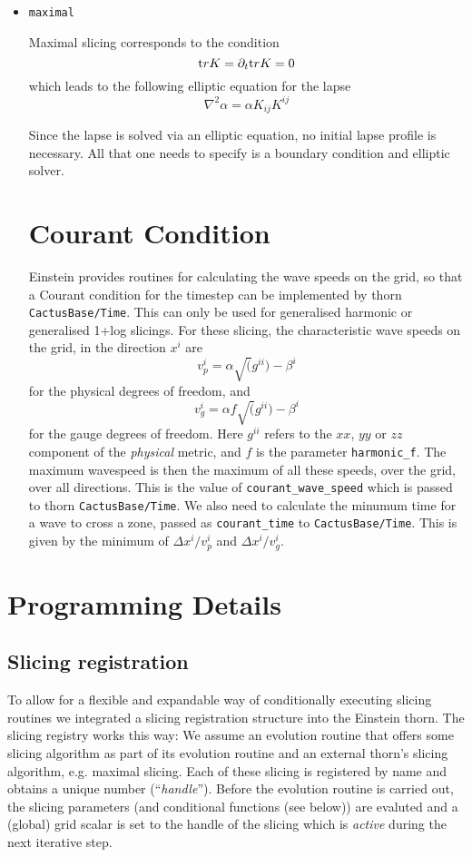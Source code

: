 \documentclass{article}
\begin{document}
\begin{itemize}
\item{\tt maximal}

Maximal slicing corresponds to the condition
$$
{\mbox tr}K = \partial_t {\mbox tr} K = 0
$$
which leads to the following elliptic equation for the lapse
$$
\nabla^2\alpha = \alpha K_{ij} K^{ij}
$$

Since the lapse is solved via an elliptic equation, no initial lapse
profile is necessary.
All that one needs to specify is a boundary condition and elliptic solver.


\section{Courant Condition}

Einstein provides routines for calculating the wave speeds on the grid,
so that a Courant condition for the timestep can be implemented by
thorn {\tt CactusBase/Time}. This can only be used for generalised harmonic 
or generalised 1+log slicings. For these slicing, the characteristic
wave speeds on the grid, in the direction $x^i$ are
$$
v_p^i = \alpha \sqrt(g^{ii})-\beta^i
$$
for the physical degrees of freedom, and
$$
v_g^i = \alpha f \sqrt(g^{ii})-\beta^i
$$
for the gauge degrees of freedom. Here $g^{ii}$ refers to the $xx$, $yy$ or $zz$ component of
the {\it physical} metric, and $f$ is the parameter {\tt harmonic\_f}.
 The maximum wavespeed is then the maximum of all these speeds,
over the grid, over all directions. This is the value of {\tt courant\_wave\_speed} which
is passed to thorn {\tt CactusBase/Time}.  We also need to calculate the minumum time for
a wave to cross a zone, passed as {\tt courant\_time} to {\tt CactusBase/Time}. This is
given by the minimum of $\Delta x^i/v_p^i$ and $\Delta x^i/v_g^i$. 

\end{itemize}


\section{Programming Details}
\label{sect-programming-details}

\subsection{Slicing registration}
To allow for a flexible and expandable way of conditionally executing slicing
routines we integrated a slicing registration structure into the Einstein
thorn. The slicing registry works this way:
We assume an evolution routine that offers some slicing algorithm as
part of its evolution routine and an external thorn's slicing algorithm, e.g.
maximal slicing. Each of these slicing is registered by name and
obtains a unique number (``{\em handle}''). Before the evolution routine is
carried out, the slicing parameters (and conditional functions (see
below)) are evaluted and a (global) grid scalar is set to the handle
of the slicing which is {\em active} during the next iterative step.
\end{document}
